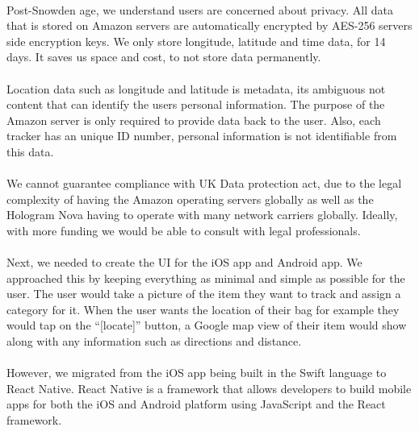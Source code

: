 \documentclass[12pt,a4paper]{article}
\begin{document}
        \paragraph{} Post-Snowden age, we understand users are concerned about privacy. All data that is stored on Amazon servers are automatically encrypted by AES-256 servers side encryption keys. We only store longitude, latitude and time data, for 14 days. It saves us space and cost, to not store data permanently.
        
        \paragraph{} Location data such as longitude and latitude is metadata, its ambiguous not content that can identify the users personal information. The purpose of the Amazon server is only required to provide data back to the user. Also, each tracker has an unique ID number, personal information is not identifiable from this data. 
        
        \paragraph{} We cannot guarantee compliance with UK Data protection act, due to the legal complexity of having the Amazon operating servers globally as well as the Hologram Nova having to operate with many network carriers globally. Ideally, with more funding we would be able to consult with legal professionals. 
        
        \paragraph{} Next, we needed to create the UI for the iOS app and Android app. We approached this by keeping everything as minimal and simple as possible for the user. The user would take a picture of the item they want to track and assign a category for it. When the user wants the location of their bag for example they would tap on the “[locate]” button, a Google map view of their item would show along with any information such as directions and distance. 
        
        \paragraph{} However, we migrated from the iOS app being built in the Swift language to React Native. React Native is a framework that allows developers to build mobile apps for both the iOS and Android platform using JavaScript and the React framework. 
        
\end{document}
